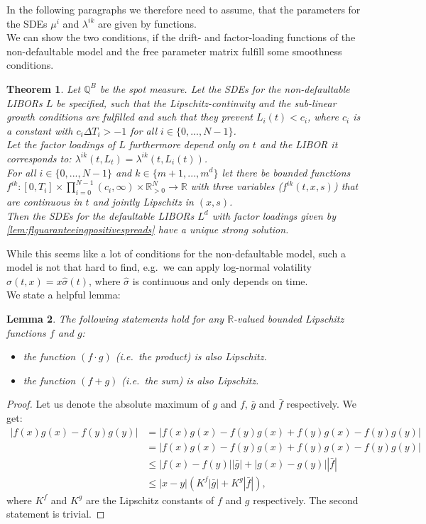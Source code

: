 \documentclass[12pt]{article}
\newtheorem{theorem}{Theorem}[section]
\newtheorem{lemma}[theorem]{Lemma}
\begin{document}
	In the following paragraphs we therefore need to assume, that the parameters for the SDEs $\mu^{i}$ and $\lambda^{i k}$ are given by functions.\\
	We can show the two conditions, if the drift- and factor-loading  functions of the non-defaultable model and the free parameter matrix fulfill some smoothness conditions.
	\begin{theorem}\label{theo:existence}
		Let $\mathbb{Q}^B$ be the spot measure. 
		Let the SDEs for the non-defaultable LIBORs $L$ be specified, such that the Lipschitz-continuity and the sub-linear growth conditions are fulfilled and such that they prevent $L_i(t) < c_i$, where $c_i$ is a constant with $c_i\Delta T_i > -1$ for all $i \in \{0, ..., N-1\}$. \\
		Let the factor loadings of $L$ furthermore depend only on $t$ and the LIBOR it corresponds to: $\lambda^{i k}(t, L_t) = \lambda^{i k}(t,L_i(t))$.\\
		For all $i\in\{0, ..., N-1\}$ and $k \in \{m+1, ..., m^d\}$ let there be bounded functions $f^{i k}: \left[0,T_i\right]\times \prod_{i=0}^{N-1}\left(c_i,\infty\right)\times \mathbb{R}_{>0}^N \rightarrow\mathbb{R}$ with three variables ($f^{i k}(t,x,s)$) that are continuous in $t$ and jointly Lipschitz in $(x,s)$.\\
		Then the SDEs for the defaultable LIBORs $L^d$ with factor loadings given by \cref{lem:flguaranteeingpositivespreads} have a unique strong solution.
	\end{theorem}
	While this seems like a lot of conditions for the non-defaultable model, such a model is not that hard to find, e.g.\ we can apply log-normal volatility $\sigma(t,x) = x\hat{\sigma}(t)$, where $\hat{\sigma}$ is continuous and only depends on time.\\
	We state a helpful lemma:
	\begin{lemma}\label{lem:basicLipschitz}
		The following statements hold for any $\mathbb{R}$-valued bounded Lipschitz functions $f$ and $g$:
		\begin{itemize}
			\item the function $(f\cdot g)$ (i.e.\ the product) is also Lipschitz.
			\item the function $(f + g)$ (i.e.\ the sum) is also Lipschitz.
		\end{itemize}
	\end{lemma}
	\begin{proof}
		Let us denote the absolute maximum of $g$ and $f$, $\bar{g}$ and $\bar{f}$ respectively. We get:
		\begin{align*}
			|f(x)g(x) - f(y)g(y) | &= | f(x)g(x) - f(y)g(x) + f(y)g(x) - f(y)g(y)|\\
			&= | f(x)g(x) - f(y)g(x) + f(y)g(x) - f(y)g(y) |\\
			&\le | f(x) - f(y)| | \bar{g} | + | g(x) - g(y)| | \bar{f} |\\
			&\le | x - y| \left(K^f| \bar{g} | + K^g| \bar{f} |\right),
		\end{align*}
		where $K^f$ and $K^g$ are the Lipschitz constants of $f$ and $g$ respectively.
		The second statement is trivial.
	\end{proof}
\end{document}
